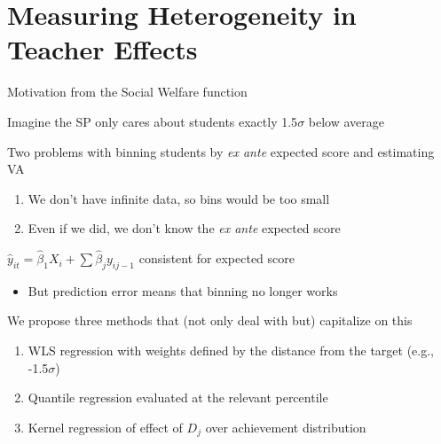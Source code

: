 \documentclass[t,aspectratio=169,11pt]{beamer}
\newenvironment{wideitemize}{\itemize\addtolength{\itemsep}{14pt}}{\enditemize}
\begin{document}
\section{Measuring Heterogeneity in Teacher Effects}


\begin{frame}{Motivation from the Social Welfare function}

\begin{wideitemize}
    \item Imagine the SP only cares about students exactly 1.5$\sigma$ below average
    
    \item<2-> Two problems with binning students by \textit{ex ante} expected score and estimating VA
    \begin{enumerate}
        \item<3-> We don't have infinite data, so bins would be too small
        \item<4-> Even if we did, we don't know the \textit{ex ante} expected score
    \end{enumerate}

    \item<5-> $\hat{y}_{it} = \hat{\beta}_1X_i + \sum \hat{\beta}_jy_{ij-1}$ consistent for expected score
    \begin{itemize}
        \item But prediction error means that binning no longer works %
    \end{itemize}

    \item<6-> We propose three methods that (not only deal with but) capitalize on this
    \begin{enumerate}
        \item WLS regression with weights defined by the distance from the target (e.g., -1.5$\sigma$)
        \item Quantile regression evaluated at the relevant percentile
        \item Kernel regression of effect of $D_j$ over achievement distribution
    \end{enumerate}

\end{wideitemize}



\end{frame}
\end{document}
